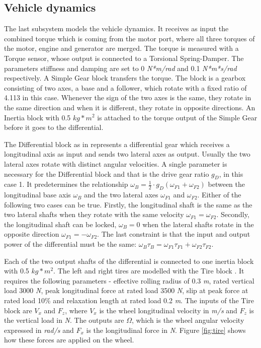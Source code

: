 \subsection{Vehicle dynamics}
The last subsystem models the vehicle dynamics. It receives as input the combined torque which is coming from the motor port, where all three torques of the motor, engine and generator are merged. The torque is measured with a Torque sensor, whose output is connected to a Torsional Spring-Damper. The parameters stiffness and damping are set to 0 \textit{N*m/rad} and 0.1 \textit{N*m*s/rad} respectively. A Simple Gear block \citep{simpleGearMatlab} transfers the torque. The block is a gearbox consisting of two axes, a base and a follower, which rotate with a fixed ratio of 4.113 in this case. Whenever the sign of the two axes is the same, they rotate in the same direction and when it is different, they rotate in opposite directions. An Inertia block with 0.5 $kg*m^2$ is attached to the torque output of the Simple Gear before it goes to the differential. 

The Differential block as in \citet{differentialMatlab} represents a differential gear which receives a longitudinal axis as input and sends two lateral axes as output. Usually the two lateral axes rotate with distinct angular velocities. A single parameter is necessary for the Differential block and that is the  drive gear ratio $g_D$, in this case 1. It predetermines the relationship $\omega_B = \frac{1}{2} \cdot g_D(\omega_{F1} + \omega_{F2})$ between the longitudinal base axis $\omega_B$ and the two lateral axes $\omega_{F1}$ and $\omega_{F2}$. Either of the following two cases can be true. Firstly, the longitudinal shaft is the same as the two lateral shafts when they rotate with the same velocity $\omega_{F1} = \omega_{F2}$. Secondly, the longitudinal shaft can be locked, $\omega_B = 0$ when the lateral shafts rotate in the opposite direction $\omega_{F1} = -\omega_{F2}$. The last constraint is that the input and output power of the differential must be the same: $\omega_B \tau_B = \omega_{F1} \tau_{F1} + \omega_{F2} \tau_{F2}$.

Each of the two output shafts of the differential is connected to one inertia block with 0.5 $kg*m^2$. The left and right tires are modelled with the Tire block \citep{tireMatlab}. It requires the following parameters - effective rolling radius of 0.3 \textit{m}, rated vertical load 3000 \textit{N}, peak longitudinal force at rated load 3500 \textit{N}, slip at peak force at rated load 10\% and relaxation length at rated load 0.2 \textit{m}. The inputs of the Tire block are $V_x$ and $F_z$, where $V_x$ is the wheel longitudinal velocity in \textit{m/s} and $F_z$ is the vertical load in \textit{N}. The outputs are $\Omega$, which is the wheel angular velocity expressed in \textit{rad/s} and $F_x$ is the longitudinal force in \textit{N}. Figure \ref{fig:tire} shows how these forces are applied on the wheel.

